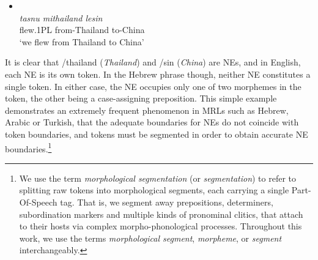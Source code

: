 \documentclass[11pt,a4paper]{article}
\begin{document}
\begin{itemize}
    \item[(1)] \\
    {\em tasnu  \hspace{0.8cm} mithailand \hspace{0.8cm} lesin}\\
    {\small flew.1PL \hspace{0.4cm} from-Thailand \hspace{0.45cm} to-China}\\
    `we flew from Thailand to China'
\end{itemize} 
It is clear that /thailand (\emph{Thailand}) and /sin (\emph{China}) are NEs, and in English, each NE is its own token. In the Hebrew phrase though, neither NE constitutes a single token. In either case, the NE occupies only one of two  morphemes in the token, the other being a case-assigning preposition. 
This  simple example demonstrates an extremely frequent phenomenon in MRLs such as Hebrew, Arabic or Turkish,  that the adequate boundaries for NEs do not coincide with token boundaries, and   tokens must be segmented in order to obtain accurate NE boundaries.\footnote{We use the term {\em morphological segmentation} (or {\em segmentation})  to refer to splitting raw tokens into morphological segments, each carrying a single Part-Of-Speech tag. That is, we segment away  prepositions, determiners, subordination markers and multiple kinds of pronominal clitics, that attach to their hosts via complex morpho-phonological processes.
Throughout this work, we use the terms {\em morphological segment}, {\em morpheme},  or {\em segment} interchangeably.} 
\end{document}
